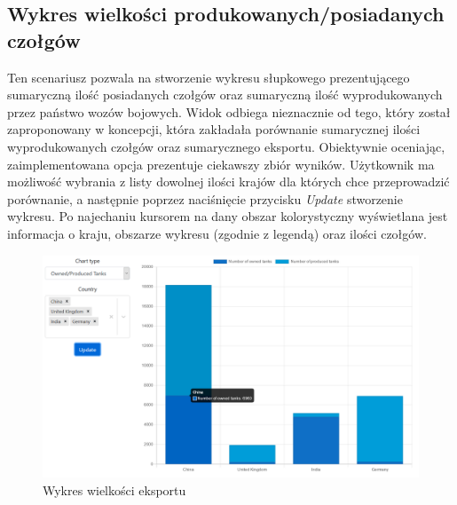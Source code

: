 \subsection{Wykres wielkości produkowanych/posiadanych czołgów}
Ten scenariusz pozwala na stworzenie wykresu słupkowego prezentującego sumaryczną ilość posiadanych czołgów oraz sumaryczną ilość wyprodukowanych przez państwo wozów bojowych. Widok odbiega nieznacznie od tego, który został zaproponowany w koncepcji, która zakładała porównanie sumarycznej ilości wyprodukowanych czołgów oraz sumarycznego eksportu. Obiektywnie oceniając, zaimplementowana opcja prezentuje ciekawszy zbiór wyników. Użytkownik ma możliwość wybrania z listy dowolnej ilości krajów dla których chce przeprowadzić porównanie, a następnie poprzez naciśnięcie przycisku \textit{Update} stworzenie wykresu. Po najechaniu kursorem na dany obszar kolorystyczny wyświetlana jest informacja o kraju, obszarze wykresu (zgodnie z legendą) oraz ilości czołgów. 
\begin{figure}[H]
    \centering \includegraphics[width=0.9\linewidth]{tex/owned_produced.PNG}
    \caption{Wykres wielkości eksportu}
    \label{fig:owned_exported}
\end{figure}

